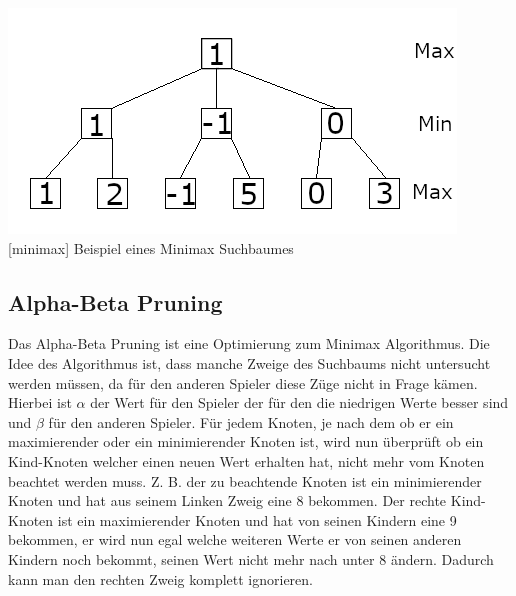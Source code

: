 \documentclass[12pt,a4paper,bibliography=totocnumbered,listof=totocnumbered]{article}
\begin{document}
\vspace{1em}
\begin{minipage}{\linewidth}
	\centering
	\includegraphics[width=0.5\linewidth]{pics/minimax.png}
	[minimax]{ Beispiel eines Minimax Suchbaumes }
	\label{fig:minimax}
\end{minipage}

\subsection{Alpha-Beta Pruning}
Das Alpha-Beta Pruning ist eine Optimierung zum Minimax Algorithmus. Die Idee des Algorithmus ist, 
dass manche Zweige des Suchbaums nicht untersucht werden müssen, da für den anderen Spieler diese
Züge nicht in Frage kämen. Hierbei ist $\alpha$ der Wert für den Spieler der für den die niedrigen Werte 
besser sind und $\beta$ für den anderen Spieler. Für jedem Knoten, je nach dem ob er ein maximierender
oder ein minimierender Knoten ist, wird nun überprüft ob ein Kind-Knoten welcher einen neuen Wert
erhalten hat, nicht mehr vom Knoten beachtet werden muss. Z. B. der zu beachtende Knoten ist ein minimierender Knoten und 
hat aus seinem Linken Zweig eine 8 bekommen. Der rechte Kind-Knoten ist ein maximierender Knoten und
hat von seinen Kindern eine 9 bekommen, er wird nun egal welche weiteren Werte er von seinen anderen 
Kindern noch bekommt, seinen Wert nicht mehr nach unter 8 ändern. Dadurch kann man den rechten Zweig 
komplett ignorieren. 
\end{document}
